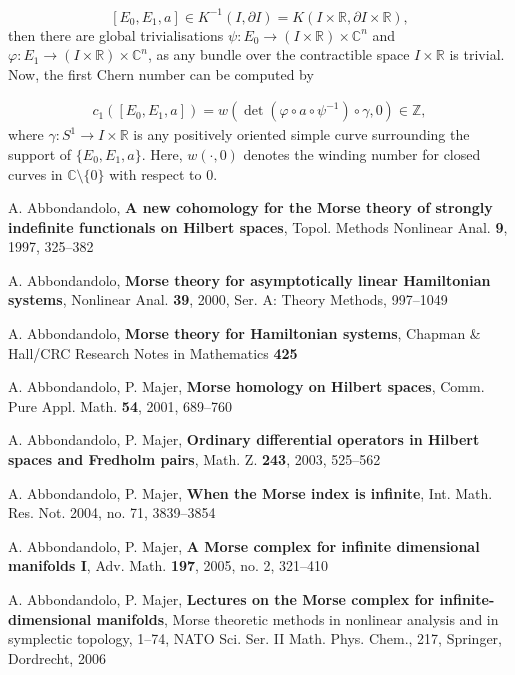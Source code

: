 \documentclass[a4paper,10pt]{article}
\begin{document}
\[[E_0,E_1,a]\in K^{-1}(I,\partial I)=K(I\times\mathbb{R},\partial I\times\mathbb{R}),\]
then there are global trivialisations $\psi: E_0\rightarrow(I\times\mathbb{R})\times\mathbb{C}^n$ and $\varphi:E_1\rightarrow(I\times\mathbb{R})\times\mathbb{C}^n$, as any bundle over the contractible space $I\times\mathbb{R}$ is trivial. Now, the first Chern number can be computed by

\begin{align}\label{Chern}
c_1([E_0,E_1,a])=w(\det(\varphi\circ a\circ\psi^{-1})\circ\gamma,0)\in\mathbb{Z},
\end{align}
where $\gamma:S^1\rightarrow I\times\mathbb{R}$ is any positively oriented simple curve surrounding the support of $\{E_0,E_1,a\}$. Here, $w(\cdot,0)$ denotes the winding number for closed curves in $\mathbb{C}\setminus\{0\}$ with respect to $0$. 






 A. Abbondandolo, \textbf{A new cohomology for the Morse theory of strongly indefinite functionals on Hilbert spaces}, Topol. Methods Nonlinear Anal. \textbf{9}, 1997, 325--382

 A. Abbondandolo, \textbf{Morse theory for asymptotically linear Hamiltonian systems}, 
 Nonlinear Anal. \textbf{39}, 2000, Ser. A: Theory Methods, 997--1049
 
 A. Abbondandolo, \textbf{Morse theory for Hamiltonian systems}, Chapman \& Hall/CRC Research Notes in Mathematics \textbf{425}

 A. Abbondandolo, P. Majer, \textbf{Morse homology on Hilbert spaces}, Comm. Pure Appl. Math.  \textbf{54}, 2001, 689--760

 A. Abbondandolo, P. Majer, \textbf{Ordinary differential operators in Hilbert spaces and Fredholm pairs}, Math. Z. \textbf{243}, 2003, 525--562

 A. Abbondandolo, P. Majer, \textbf{When the Morse index is infinite}, Int. Math. Res. Not. 2004,  no. 71, 3839--3854

 A. Abbondandolo, P. Majer, \textbf{A Morse complex for infinite dimensional manifolds I}, Adv. Math. \textbf{197}, 2005,  no. 2, 321--410

  A. Abbondandolo, P. Majer, \textbf{Lectures on the Morse complex for infinite-dimensional manifolds}, Morse theoretic methods in nonlinear analysis and in symplectic topology, 1--74, NATO Sci. Ser. II Math. Phys. Chem., 217, Springer, Dordrecht, 2006
\end{document}
